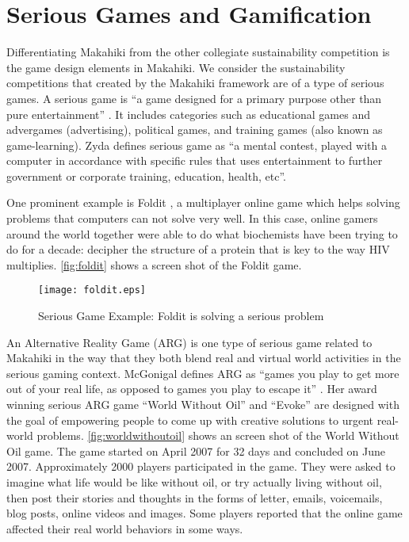 \section {Serious Games and Gamification}
\label{sec:rel-seriousgame}

Differentiating Makahiki from the other collegiate sustainability competition is the game design elements in Makahiki. We consider the sustainability competitions that created by the Makahiki framework are of a type of serious games.  A serious game is ``a game designed for a primary purpose other than pure entertainment'' \cite {WikipediaSeriousGame}. It includes categories such as educational games and advergames (advertising), political games, and training games (also known as game-learning). Zyda \cite{Zyda2005} defines serious game as ``a mental contest, played with a computer in accordance with specific rules that uses entertainment to further government or corporate training, education, health, etc''. 

One prominent example is Foldit \cite {khatib2011crystal}, a multiplayer online game which helps solving problems that computers can not solve very well. In this case, online gamers around the world together were able to do what biochemists have been trying to do for a decade: decipher the structure of a protein that is key to the way HIV multiplies. \autoref{fig:foldit} shows a screen shot of the Foldit game.

\begin{figure}[ht!]
	\centering
		\texttt{[image: foldit.eps]}
		\caption{Serious Game Example: Foldit is solving a serious problem \cite {khatib2011crystal}} 
		\label{fig:foldit}
\end{figure}

An Alternative Reality Game (ARG) is one type of serious game related to Makahiki in the way that they both  blend real and virtual world activities in the serious gaming context. McGonigal defines ARG as ``games you play to get more out of your real life, as opposed to games you play to escape it'' \cite{mcgonigal2011reality}. Her award winning serious ARG game ``World Without Oil'' \cite{worldwithoutoil} and ``Evoke'' \cite{urgentevoke} are designed with the goal of empowering people to come up with creative solutions to urgent real-world problems. \autoref{fig:worldwithoutoil} shows an screen shot of the World Without Oil game. The game started on April 2007 for 32 days and concluded on June 2007. Approximately 2000 players participated in the game. They were asked to imagine what life would be like without oil, or try actually living without oil, then post their stories and thoughts in the forms of letter, emails, voicemails, blog posts, online videos and images. Some players reported that the online game affected their real world behaviors in some ways\cite{mcgonigal2011reality}.

